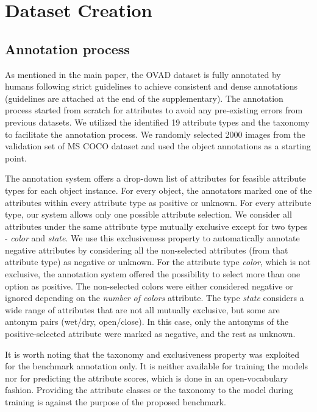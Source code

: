 \documentclass[10pt,twocolumn,letterpaper]{article}
\begin{document}
\section{Dataset Creation}
\subsection{Annotation process}
As mentioned in the main paper, the OVAD dataset is fully annotated by humans following strict guidelines to achieve consistent and dense annotations (guidelines are attached at the end of the supplementary). The annotation process started from scratch for attributes to avoid any pre-existing errors from previous datasets. We utilized the identified 19 attribute types and the taxonomy to facilitate the annotation process. We randomly selected 2000 images from the validation set of MS COCO dataset and used the object annotations as a starting point. 

The annotation system offers a drop-down list of attributes for feasible attribute types for each object instance. For every object, the annotators marked one of the attributes within every attribute type as positive or unknown. For every attribute type, our system allows only one possible attribute selection. We consider all attributes under the same attribute type mutually exclusive except for two types  - \textit{color} and \textit{state}. We use this exclusiveness property to automatically annotate negative attributes by considering all the non-selected attributes (from that attribute type) as negative or unknown. For the attribute type \textit{color}, which is not exclusive, the annotation system offered the possibility to select more than one option as positive. The non-selected colors were either considered negative or ignored depending on the \textit{number of colors} attribute. The type \textit{state} considers a wide range of attributes that are not all mutually exclusive, but some are antonym pairs (\eg wet/dry, open/close). In this case, only the antonyms of the positive-selected attribute were marked as negative, and the rest as unknown. 

It is worth noting that the taxonomy and exclusiveness property was exploited for the benchmark annotation only. It is neither available for training the models nor for predicting the attribute scores, which is done in an open-vocabulary fashion. Providing the attribute classes or the taxonomy to the model during training is against the purpose of the proposed benchmark.
\end{document}
